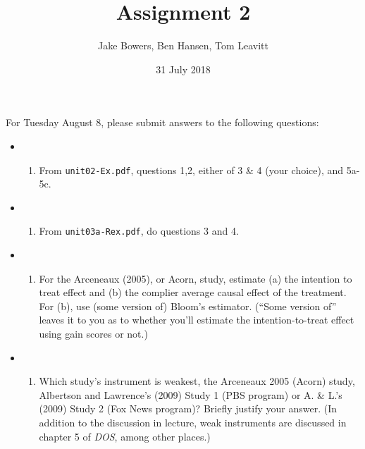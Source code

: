 \documentclass[11pt,]{article}
\title{Assignment 2}
\author{Jake Bowers, Ben Hansen, Tom Leavitt}
\date{31 July 2018}
\begin{document}
\maketitle

For Tuesday August 8, please submit answers to the following questions:

\begin{itemize}
\item
  \begin{enumerate}
  \def\labelenumi{(\Alph{enumi})}
  \itemsep1pt\parskip0pt
  \item
    From \texttt{unit02-Ex.pdf}, questions 1,2, either of 3 \& 4 (your
    choice), and 5a-5c.
  \end{enumerate}
\item
  \begin{enumerate}
  \def\labelenumi{(\Alph{enumi})}
  \setcounter{enumi}{1}
  \itemsep1pt\parskip0pt
  \item
    From \texttt{unit03a-Rex.pdf}, do questions 3 and 4.
  \end{enumerate}
\item
  \begin{enumerate}
  \def\labelenumi{(\Alph{enumi})}
  \setcounter{enumi}{2}
  \itemsep1pt\parskip0pt
  \item
    For the Arceneaux (2005), or Acorn, study, estimate (a) the
    intention to treat effect and (b) the complier average causal effect
    of the treatment. For (b), use (some version of) Bloom's estimator.
    (``Some version of'' leaves it to you as to whether you'll estimate
    the intention-to-treat effect using gain scores or not.)\\
  \end{enumerate}
\item
  \begin{enumerate}
  \def\labelenumi{(\Alph{enumi})}
  \setcounter{enumi}{3}
  \itemsep1pt\parskip0pt
  \item
    Which study's instrument is weakest, the Arceneaux 2005 (Acorn)
    study, Albertson and Lawrence's (2009) Study 1 (PBS program) or A.
    \& L.'s (2009) Study 2 (Fox News program)? Briefly justify your
    answer. (In addition to the discussion in lecture, weak instruments
    are discussed in chapter 5 of \emph{DOS}, among other places.)
  \end{enumerate}
\end{itemize}
\end{document}

